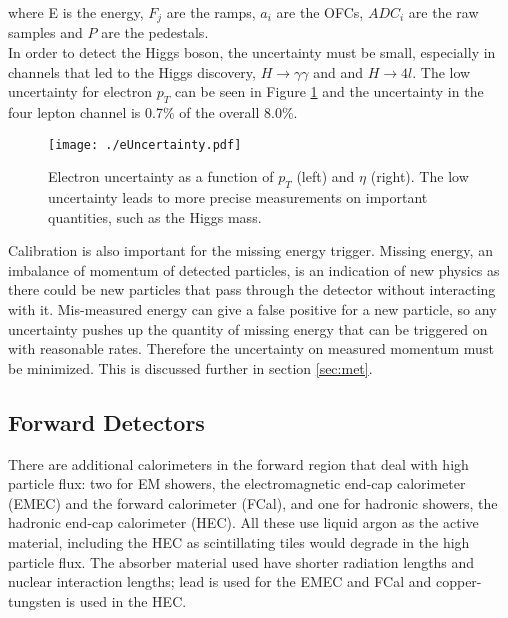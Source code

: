 where E is the energy, $F_{j}$ are the ramps, $a_{i}$ are the OFCs, $ADC_{i}$ are the raw samples and $P$ are the pedestals.  \\

In order to detect the Higgs boson, the uncertainty must be small, especially in channels that led to the Higgs discovery, $H \rightarrow \gamma \gamma$ and and $H \rightarrow 4l$.  The low uncertainty for electron $p_{T}$ can be seen in Figure \ref{fig:euncertainty} and the uncertainty in the four lepton channel is 0.7\% of the overall 8.0\%\cite{HiggsAtlas}. \\

\begin{figure}[h!]
  \centering
	\texttt{[image: ./eUncertainty.pdf]}
\caption{\label{fig:euncertainty}{Electron uncertainty as a function of $p_{T}$ (left) and $\eta$ (right)\cite{eUncertaintyPaper}.  The low uncertainty leads to more precise measurements on important quantities, such as the Higgs mass.}} 
\end{figure}

Calibration is also important for the missing energy trigger.  Missing energy, an imbalance of momentum of detected particles, is an indication of new physics as there could be new particles that pass through the detector without interacting with it.  Mis-measured energy can give a false positive for a new particle, so any uncertainty pushes up the quantity of missing energy that can be triggered on with reasonable rates.  Therefore the uncertainty on measured momentum must be minimized.  This is discussed further in section \ref{sec:met}.

\subsection{Forward Detectors}

There are additional calorimeters in the forward region that deal with high particle flux: two for EM showers, the electromagnetic end-cap calorimeter (EMEC) and the forward calorimeter (FCal), and one for hadronic showers, the hadronic end-cap calorimeter (HEC).  All these use liquid argon as the active material, including the HEC as scintillating tiles would degrade in the high particle flux.  The absorber material used have shorter radiation lengths and nuclear interaction lengths; lead is used for the EMEC and FCal and copper-tungsten is used in the HEC. \\

